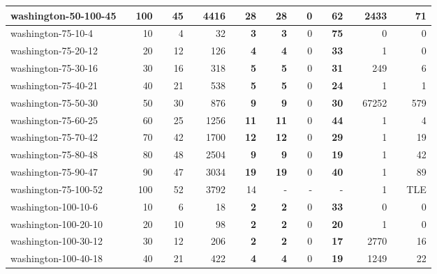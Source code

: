 \begin{table}[!ht]
{\begin{tabular}{llrlrlrlrlrlrlrlrlr}
\rowcolor[HTML]{9B9B9B} 
washington-50-100-45 &  & 100 &  & 45 &  & 4416 &  & \textbf{28} &  & \textbf{28} &  & 0 &  & \textbf{62} &  & 2433 &  & 71 \\ \hline
\rowcolor[HTML]{9B9B9B} 
washington-75-10-4 &  & 10 &  & 4 &  & 32 &  & \textbf{3} &  & \textbf{3} &  & 0 &  & \textbf{75} &  & 0 &  & 0 \\
\rowcolor[HTML]{9B9B9B} 
washington-75-20-12 &  & 20 &  & 12 &  & 126 &  & \textbf{4} &  & \textbf{4} &  & 0 &  & \textbf{33} &  & 1 &  & 0 \\
\rowcolor[HTML]{9B9B9B} 
washington-75-30-16 &  & 30 &  & 16 &  & 318 &  & \textbf{5} &  & \textbf{5} &  & 0 &  & \textbf{31} &  & 249 &  & 6 \\
\rowcolor[HTML]{9B9B9B} 
washington-75-40-21 &  & 40 &  & 21 &  & 538 &  & \textbf{5} &  & \textbf{5} &  & 0 &  & \textbf{24} &  & 1 &  & 1 \\
\rowcolor[HTML]{9B9B9B} 
washington-75-50-30 &  & 50 &  & 30 &  & 876 &  & \textbf{9} &  & \textbf{9} &  & 0 &  & \textbf{30} &  & 67252 &  & 579 \\
\rowcolor[HTML]{9B9B9B} 
washington-75-60-25 &  & 60 &  & 25 &  & 1256 &  & \textbf{11} &  & \textbf{11} &  & 0 &  & \textbf{44} &  & 1 &  & 4 \\
\rowcolor[HTML]{9B9B9B} 
washington-75-70-42 &  & 70 &  & 42 &  & 1700 &  & \textbf{12} &  & \textbf{12} &  & 0 &  & \textbf{29} &  & 1 &  & 19 \\
\rowcolor[HTML]{9B9B9B} 
washington-75-80-48 &  & 80 &  & 48 &  & 2504 &  & \textbf{9} &  & \textbf{9} &  & 0 &  & \textbf{19} &  & 1 &  & 42 \\
\rowcolor[HTML]{9B9B9B} 
washington-75-90-47 &  & 90 &  & 47 &  & 3034 &  & \textbf{19} &  & \textbf{19} &  & 0 &  & \textbf{40} &  & 1 &  & 89 \\
washington-75-100-52 &  & 100 &  & 52 &  & 3792 &  & 14 &  & - &  & - &  & - &  & 1 &  & TLE \\ \hline
\rowcolor[HTML]{9B9B9B} 
washington-100-10-6 &  & 10 &  & 6 &  & 18 &  & \textbf{2} &  & \textbf{2} &  & 0 &  & \textbf{33} &  & 0 &  & 0 \\
\rowcolor[HTML]{9B9B9B} 
washington-100-20-10 &  & 20 &  & 10 &  & 98 &  & \textbf{2} &  & \textbf{2} &  & 0 &  & \textbf{20} &  & 1 &  & 0 \\
\rowcolor[HTML]{9B9B9B} 
washington-100-30-12 &  & 30 &  & 12 &  & 206 &  & \textbf{2} &  & \textbf{2} &  & 0 &  & \textbf{17} &  & 2770 &  & 16 \\
\rowcolor[HTML]{9B9B9B} 
washington-100-40-18 &  & 40 &  & 21 &  & 422 &  & \textbf{4} &  & \textbf{4} &  & 0 &  & \textbf{19} &  & 1249 &  & 22 \\

\end{tabular}}
\end{table}
